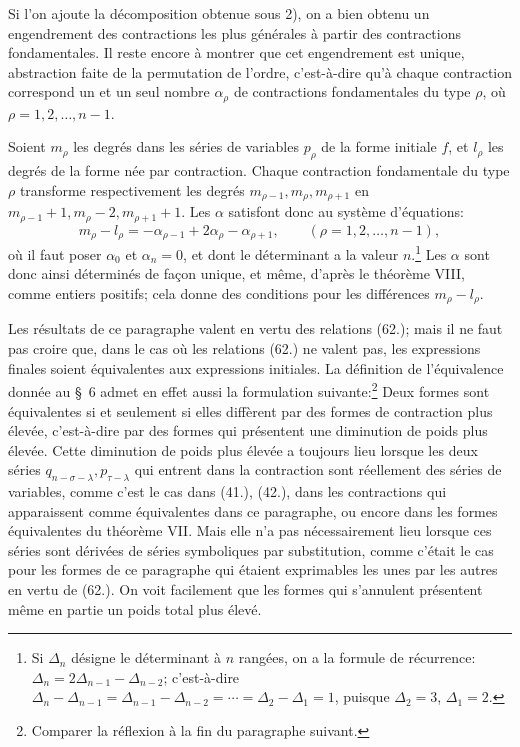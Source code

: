 \documentclass[11pt]{article}
\begin{document}
Si l'on ajoute la décomposition obtenue sous 2), on a bien obtenu un engendrement des contractions les plus générales à partir des contractions fondamentales. Il reste encore à montrer que cet engendrement est unique, abstraction faite de la permutation de l'ordre, c'est-à-dire qu'à chaque contraction correspond un et un seul nombre $\alpha_\rho$ de contractions fondamentales du type $\rho$, où $\rho=1,2,\ldots,n-1$.

Soient $m_\rho$ les degrés dans les séries de variables $p_\rho$ de la forme initiale $f$, et $l_\rho$ les degrés de la forme née par contraction. Chaque contraction fondamentale du type $\rho$ transforme respectivement les degrés $m_{\rho-1},m_\rho,m_{\rho+1}$ en $m_{\rho-1}+1,m_\rho-2,m_{\rho+1}+1$. Les $\alpha$ satisfont donc au système d'équations:
\begin{equation}
 m_\rho-l_\rho=-\alpha_{\rho-1}+2\alpha_\rho-\alpha_{\rho+1},
 \qquad (\rho=1,2,\ldots,n-1),
\tag{70}
\end{equation}
où il faut poser $\alpha_0$ et $\alpha_n=0$, et dont le déterminant a la valeur $n$.\footnote{Si $\Delta_n$ désigne le déterminant à $n$ rangées, on a la formule de récurrence: $\Delta_n=2\Delta_{n-1}-\Delta_{n-2}$; c'est-à-dire $\Delta_n-\Delta_{n-1}=\Delta_{n-1}-\Delta_{n-2}=\cdots=\Delta_2-\Delta_1=1$, puisque $\Delta_2=3$, $\Delta_1=2$.} Les $\alpha$ sont donc ainsi déterminés de façon unique, et même, d'après le théorème VIII, comme entiers positifs; cela donne des conditions pour les différences $m_\rho-l_\rho$.

Les résultats de ce paragraphe valent en vertu des relations (62.); mais il ne faut pas croire que, dans le cas où les relations (62.) ne valent pas, les expressions finales soient équivalentes aux expressions initiales. La définition de l'équivalence donnée au \S\ 6 admet en effet aussi la formulation suivante:\footnote{Comparer la réflexion à la fin du paragraphe suivant.} \og{} Deux formes sont équivalentes si et seulement si elles diffèrent par des formes de contraction plus élevée, c'est-à-dire par des formes qui présentent une diminution de poids plus élevée. \fg{} Cette diminution de poids plus élevée a toujours lieu lorsque les deux séries $q_{n-\sigma-\lambda},p_{\tau-\lambda}$ qui entrent dans la contraction sont réellement des séries de variables, comme c'est le cas dans (41.), (42.), dans les contractions qui apparaissent comme équivalentes dans ce paragraphe, ou encore dans les formes équivalentes du théorème VII. Mais elle n'a pas nécessairement lieu lorsque ces séries sont dérivées de séries symboliques par substitution, comme c'était le cas pour les formes de ce paragraphe qui étaient exprimables les unes par les autres en vertu de (62.). On voit facilement que les formes qui s'annulent présentent même en partie un poids total plus élevé.
\end{document}
